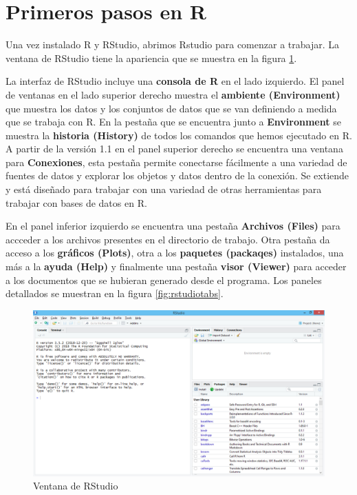 \documentclass[
]{krantz}
\begin{document}
\hypertarget{primerR}{%
\section{Primeros pasos en R}\label{primerR}}

Una vez instalado R y RStudio, abrimos Rstudio para comenzar a trabajar. La ventana de RStudio tiene la apariencia que se muestra en la figura \ref{fig:rstudio1}.

La interfaz de RStudio incluye una \textbf{consola de R} en el lado izquierdo. El panel de ventanas en el lado superior derecho muestra el \textbf{ambiente (Environment)} que muestra los datos y los conjuntos de datos que se van definiendo a medida que se trabaja con R. En la pestaña que se encuentra junto a \textbf{Environment} se muestra la \textbf{historia (History)} de todos los comandos que hemos ejecutado en R. A partir de la versión 1.1 en el panel superior derecho se encuentra una ventana para \textbf{Conexiones}, esta pestaña permite conectarse fácilmente a una variedad de fuentes de datos y explorar los objetos y datos dentro de la conexión. Se extiende y está diseñado para trabajar con una variedad de otras herramientas para trabajar con bases de datos en R.

En el panel inferior izquierdo se encuentra una pestaña \textbf{Archivos (Files)} para accceder a los archivos presentes en el directorio de trabajo. Otra pestaña da acceso a los \textbf{gráficos (Plots)}, otra a los \textbf{paquetes (packaqes)} instalados, una más a la \textbf{ayuda (Help)} y finalmente una pestaña \textbf{visor (Viewer)} para acceder a los documentos que se hubieran generado desde el programa. Los paneles detallados se muestran en la figura \ref{fig:rstudiotabs}.

\begin{figure}[h!]

{\centering \includegraphics[width=0.5\linewidth]{rstudio1} 

}

\caption{Ventana de RStudio}\label{fig:rstudio1}
\end{figure}
\end{document}
